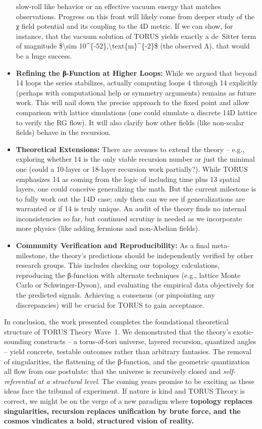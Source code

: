 \documentclass[]{article}
\begin{document}
\begin{itemize}
  slow-roll like behavior or an effective vacuum energy that matches
  observations. Progress on this front will likely come from deeper
  study of the χ field potential and its coupling to the 4D metric. If
  we can show, for instance, that the vacuum solution of TORUS yields
  exactly a de~Sitter term of magnitude \$\textbackslash{}sim
  10\^{}\{-52\},\textbackslash{}text\{m\}\^{}\{-2\}\$ (the observed Λ),
  that would be a huge success.
\item
  \textbf{Refining the β-Function at Higher Loops:} While we argued that
  beyond 14 loops the series stabilizes, actually computing loops 4
  through 14 explicitly (perhaps with computational help or symmetry
  arguments) remains as future work. This will nail down the precise
  approach to the fixed point and allow comparison with lattice
  simulations (one could simulate a discrete 14D lattice to verify the
  RG flow). It will also clarify how other fields (like non-scalar
  fields) behave in the recursion.
\item
  \textbf{Theoretical Extensions:} There are avenues to extend the
  theory -- e.g., exploring whether 14 is the only viable recursion
  number or just the minimal one (could a 10-layer or 18-layer recursion
  work partially?). While TORUS emphasizes 14 as coming from the logic
  of including time plus 13 spatial layers, one could conceive
  generalizing the math. But the current milestone is to fully work out
  the 14D case; only then can we see if generalizations are warranted or
  if 14 is truly unique. An audit of the theory finds no internal
  inconsistencies so far, but continued scrutiny is needed as we
  incorporate more physics (like adding fermions and non-Abelian
  fields).
\item
  \textbf{Community Verification and Reproducibility:} As a final
  meta-milestone, the theory's predictions should be independently
  verified by other research groups. This includes checking our topology
  calculations, reproducing the β-function with alternate techniques
  (e.g., lattice Monte Carlo or Schwinger-Dyson), and evaluating the
  empirical data objectively for the predicted signals. Achieving a
  consensus (or pinpointing any discrepancies) will be crucial for TORUS
  to gain acceptance.
\end{itemize}

In conclusion, the work presented completes the foundational theoretical
structure of TORUS Theory Wave~1. We demonstrated that the theory's
exotic-sounding constructs -- a torus-of-tori universe, layered
recursion, quantized angles -- yield concrete, testable outcomes rather
than arbitrary fantasies. The removal of singularities, the flattening
of the β-function, and the geometric quantization all flow from one
postulate: that the universe is recursively closed and
\emph{self-referential at a structural level}. The coming years promise
to be exciting as these ideas face the tribunal of experiment. If nature
is kind and TORUS Theory is correct, we might be on the verge of a new
paradigm where \textbf{topology replaces singularities, recursion
replaces unification by brute force, and the cosmos vindicates a bold,
structured vision of reality.}
\end{document}

